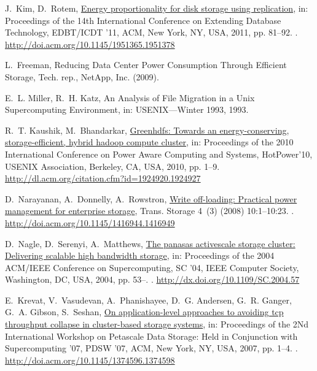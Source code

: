 \documentclass[preprint,12pt]{elsarticle}
\begin{document}
\begin{thebibliography}{10}
J.~Kim, D.~Rotem, \href{http://doi.acm.org/10.1145/1951365.1951378}{Energy
  proportionality for disk storage using replication}, in: Proceedings of the
  14th International Conference on Extending Database Technology, EDBT/ICDT
  '11, ACM, New York, NY, USA, 2011, pp. 81--92.
\newblock \href {http://dx.doi.org/10.1145/1951365.1951378}
  {}.
\newline\urlprefix\url{http://doi.acm.org/10.1145/1951365.1951378}

L.~Freeman, {Reducing Data Center Power Consumption Through Efficient Storage},
  Tech. rep., NetApp, Inc. (2009).

E.~L. Miller, R.~H. Katz, {An Analysis of File Migration in a Unix
  Supercomputing Environment}, in: USENIX---Winter 1993, 1993.

R.~T. Kaushik, M.~Bhandarkar,
  \href{http://dl.acm.org/citation.cfm?id=1924920.1924927}{Greenhdfs: Towards
  an energy-conserving, storage-efficient, hybrid hadoop compute cluster}, in:
  Proceedings of the 2010 International Conference on Power Aware Computing and
  Systems, HotPower'10, USENIX Association, Berkeley, CA, USA, 2010, pp. 1--9.
\newline\urlprefix\url{http://dl.acm.org/citation.cfm?id=1924920.1924927}

D.~Narayanan, A.~Donnelly, A.~Rowstron,
  \href{http://doi.acm.org/10.1145/1416944.1416949}{Write off-loading:
  Practical power management for enterprise storage}, Trans. Storage 4~(3)
  (2008) 10:1--10:23.
\newblock \href {http://dx.doi.org/10.1145/1416944.1416949}
  {}.
\newline\urlprefix\url{http://doi.acm.org/10.1145/1416944.1416949}

D.~Nagle, D.~Serenyi, A.~Matthews,
  \href{http://dx.doi.org/10.1109/SC.2004.57}{The panasas activescale storage
  cluster: Delivering scalable high bandwidth storage}, in: Proceedings of the
  2004 ACM/IEEE Conference on Supercomputing, SC '04, IEEE Computer Society,
  Washington, DC, USA, 2004, pp. 53--.
\newblock \href {http://dx.doi.org/10.1109/SC.2004.57}
  {}.
\newline\urlprefix\url{http://dx.doi.org/10.1109/SC.2004.57}

E.~Krevat, V.~Vasudevan, A.~Phanishayee, D.~G. Andersen, G.~R. Ganger, G.~A.
  Gibson, S.~Seshan, \href{http://doi.acm.org/10.1145/1374596.1374598}{On
  application-level approaches to avoiding tcp throughput collapse in
  cluster-based storage systems}, in: Proceedings of the 2Nd International
  Workshop on Petascale Data Storage: Held in Conjunction with Supercomputing
  '07, PDSW '07, ACM, New York, NY, USA, 2007, pp. 1--4.
\newblock \href {http://dx.doi.org/10.1145/1374596.1374598}
  {}.
\newline\urlprefix\url{http://doi.acm.org/10.1145/1374596.1374598}


\end{thebibliography}
\end{document}
